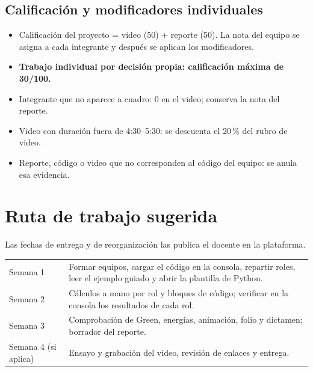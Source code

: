 \documentclass[11pt,letterpaper]{article}
\newcommand{\dest}[1]{\textcolor{accentcolor}{\textbf{#1}}}
\begin{document}
\subsection*{Calificación y modificadores individuales}
\begin{itemize}
\item Calificación del proyecto = video (50) + reporte (50). La nota del equipo se asigna a cada integrante y después se aplican los modificadores.
\item \dest{Trabajo individual por decisión propia: calificación máxima de 30/100.}
\item Integrante que no aparece a cuadro: 0 en el video; conserva la nota del reporte.
\item Video con duración fuera de 4:30--5:30: se descuenta el 20\,\% del rubro de video.
\item Reporte, código o video que no corresponden al código del equipo: se anula esa evidencia.
\end{itemize}

\section{Ruta de trabajo sugerida}
Las fechas de entrega y de reorganización las publica el docente en la plataforma.\par\smallskip
{\small
\begin{tabularx}{\linewidth}{@{}l Y@{}}\toprule
Semana 1 & Formar equipos, cargar el código en la consola, repartir roles, leer el ejemplo guiado y abrir la plantilla de Python. \\
Semana 2 & Cálculos a mano por rol y bloques de código; verificar en la consola los resultados de cada rol. \\
Semana 3 & Comprobación de Green, energías, animación, folio y dictamen; borrador del reporte. \\
Semana 4 (si aplica) & Ensayo y grabación del video, revisión de enlaces y entrega. \\ \bottomrule
\end{tabularx}}
\end{document}
